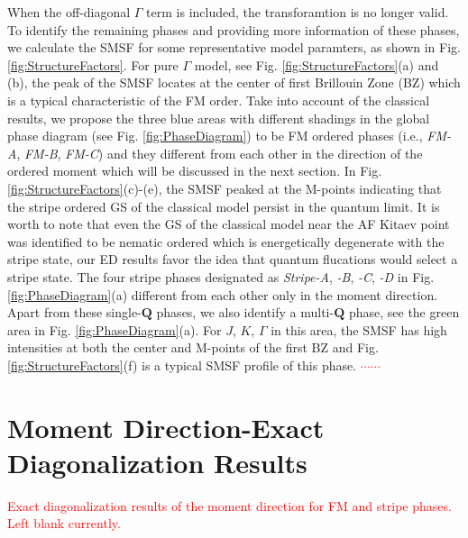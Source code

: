 \documentclass[aps,prb,reprint,amsfonts,amsmath,amssymb,showpacs,groupedaddress,superscriptaddress]{revtex4-1}
\begin{document}
When the off-diagonal $\Gamma$ term is included, the transforamtion is no longer valid. To identify the remaining phases and providing more information of these phases, we calculate the SMSF for some representative model paramters, as shown in Fig. \ref{fig:StructureFactors}. For pure $\Gamma$ model, see Fig. \ref{fig:StructureFactors}(a) and (b), the peak of the SMSF locates at the center of first Brillouin Zone (BZ) which is a typical characteristic of the FM order. Take into account of the classical results, we propose the three blue areas with different shadings in the global phase diagram (see Fig. \ref{fig:PhaseDiagram}) to be FM ordered phases (i.e., \emph{FM-A}, \emph{FM-B}, \emph{FM-C}) and they different from each other in the direction of the ordered moment which will be discussed in the next section. In Fig. \ref{fig:StructureFactors}(c)-(e), the SMSF peaked at the M-points indicating that the stripe ordered GS of the classical model persist in the quantum limit. It is worth to note that even the GS of the classical model near the AF Kitaev point was identified to be nematic ordered which is energetically degenerate with the stripe state, our ED results favor the idea that quantum flucations would select a stripe state. The four stripe phases designated as \emph{Stripe-A}, \emph{-B}, \emph{-C}, \emph{-D} in Fig. \ref{fig:PhaseDiagram}(a) different from each other only in the moment direction. Apart from these single-$\mathbf{Q}$ phases, we also identify a multi-$\mathbf{Q}$ phase, see the green area in Fig. \ref{fig:PhaseDiagram}(a). For $J$, $K$, $\Gamma$ in this area, the SMSF has high intensities at both the center and M-points of the first BZ and Fig. \ref{fig:StructureFactors}(f) is a typical SMSF profile of this phase. \textcolor{red}{$\cdots \cdots$}

\section{Moment Direction-Exact Diagonalization Results}
\textcolor{red}{Exact diagonalization results of the moment direction for FM and stripe phases. Left blank currently.}
\end{document}
